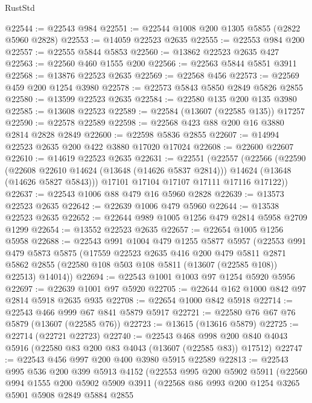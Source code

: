 \begin{lexlean}{RustStd}
\begin{coremodule}
@22544 := @22543 @984
@22551 := @22544 @1008 @200 @1305 @5855 (@2822 @5960 @2828)
@22553 := @14059 @22523 @2635
@22555 := @22553 @984 @200
@22557 := @22555 @5844 @5853
@22560 := @13862 @22523 @2635 @427
@22563 := @22560 @460 @1555 @200
@22566 := @22563 @5844 @5851 @3911
@22568 := @13876 @22523 @2635
@22569 := @22568 @456
@22573 := @22569 @459 @200 @1254 @3980
@22578 := @22573 @5843 @5850 @2849 @5826 @2855
@22580 := @13599 @22523 @2635
@22584 := @22580 @135 @200 @135 @3980
@22585 := @13608 @22523
@22589 := @22584 (@13607 (@22585 @135)) @17257
@22590 := @22578 @22589
@22598 := @22568 @423 @88 @200 @16 @3880 @2814 @2828 @2849
@22600 := @22598 @5836 @2855
@22607 := @14994 @22523 @2635 @200 @422 @3880 @17020 @17024
@22608 := @22600 @22607
@22610 := @14619 @22523 @2635
@22631 := @22551
    (@22557
      (@22566
        (@22590
          (@22608 @22610 @14624 (@13648 (@14626 @5837 @2814)))
          @14624
          (@13648 (@14626 @5827 @5843)))
        @17101
        @17104
        @17107
        @17111
        @17116
        @17122))
@22637 := @22543 @1006 @88 @479 @16 @5960 @2828
@22639 := @13573 @22523 @2635
@22642 := @22639 @1006 @479 @5960
@22644 := @13538 @22523 @2635
@22652 := @22644 @989 @1005 @1256 @479 @2814 @5958 @2709 @1299
@22654 := @13552 @22523 @2635
@22657 := @22654 @1005 @1256 @5958
@22688 := @22543
    @991
    @1004
    @479
    @1255
    @5877
    @5957
    (@22553
      @991
      @479
      @5873
      @5875
      (@17559
        @22523
        @2635
        @416
        @200
        @479
        @5811
        @2871
        @5862
        @2855
        (@22580 @108 @503 @108 @5811 (@13607 (@22585 @108)) @22513)
        @14014))
@22694 := @22543 @1001 @1003 @97 @1254 @5920 @5956
@22697 := @22639 @1001 @97 @5920
@22705 := @22644 @162 @1000 @842 @97 @2814 @5918 @2635 @935
@22708 := @22654 @1000 @842 @5918
@22714 := @22543 @466 @999 @67 @841 @5879 @5917
@22721 := @22580 @76 @67 @76 @5879 (@13607 (@22585 @76))
@22723 := @13615 (@13616 @5879)
@22725 := @22714 (@22721 @22723)
@22740 := @22543
    @468
    @998
    @200
    @840
    @4043
    @5916
    (@22580 @83 @200 @83 @4043 (@13607 (@22585 @83)) @17512)
@22747 := @22543 @456 @997 @200 @400 @3980 @5915 @22589
@22813 := @22543
    @995
    @536
    @200
    @399
    @5913
    @4152
    (@22553
      @995
      @200
      @5902
      @5911
      (@22560
        @994
        @1555
        @200
        @5902
        @5909
        @3911
        (@22568
          @86
          @993
          @200
          @1254
          @3265
          @5901
          @5908
          @2849
          @5884
          @2855

\end{coremodule}
\end{lexlean}
